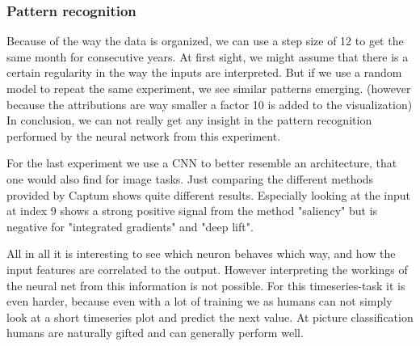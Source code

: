 \documentclass{article}
\begin{document}
\subsubsection{Pattern recognition}
Because of the way the data is organized, we can use a step size of 12 to get the same month for consecutive years. At first sight, we might assume that there is a certain regularity in the way the inputs are interpreted. But if we use a random model to repeat the same experiment, we see similar patterns emerging. (however because the attributions are way smaller a factor 10 is added to the visualization) In conclusion, we can not really get any insight in the pattern recognition performed by the neural network from this experiment.

For the last experiment we use a CNN to better resemble an architecture, that one would also find for image tasks. Just comparing the different methods provided by Captum shows quite different results. Especially looking at the input at index 9 shows a strong positive signal from the method "saliency" but is negative for "integrated gradients" and "deep lift".

All in all it is interesting to see which neuron behaves which way, and how the input features are correlated to the output. However interpreting the workings of the neural net from this information is not possible. For this timeseries-task it is even harder, because even with a lot of training we as humans can not simply look at a short timeseries plot and predict the next value. At picture classification humans are naturally gifted and can generally perform well.
\end{document}
